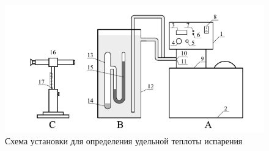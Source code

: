 \documentclass[12pt]{article}
\begin{document}
    \begin{figure}[h!]
        \centering
        \includegraphics[scale=1]{stand.png}
        \caption{Схема установки для определения удельной теплоты испарения}
        \label{stand}
    \end{figure}
\end{document}
